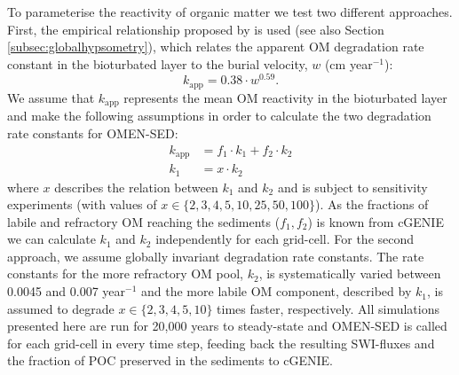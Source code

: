 \documentclass[gmd, manuscript]{copernicus}
\begin{document}
To parameterise the reactivity of organic matter we test two different approaches. First, the empirical relationship proposed by \citet{boudreau1997diagenetic} is used (see also Section \ref{subsec:globalhypsometry}), 
which relates the apparent OM degradation rate constant in the bioturbated layer to the burial velocity, $w$ (cm year$^{-1}$):
\begin{equation}
 k_\mathrm{app} = 0.38 \cdot w^{0.59}.
\end{equation}
We assume that $k_\mathrm{app}$ represents the mean OM reactivity in the bioturbated layer and make the following assumptions in order to calculate the two degradation rate constants for OMEN-SED:
\begin{align}
  k_\mathrm{app} &= f_1 \cdot k_1 + f_2 \cdot k_2 \label{boudreau_assumption1}\\
  k_1 &= x \cdot k_2					\label{boudreau_assumption2}
\end{align}
where $x$ describes the relation between $k_1$ and $k_2$ and is subject to sensitivity experiments (with values of $x \in \{2, 3, 4, 5, 10, 25, 50, 100\}$). 
As the fractions of labile and refractory OM reaching the sediments ($f_1, f_2$) is known from cGENIE we can calculate $k_1$ and $k_2$ independently for each grid-cell. 
For the second approach, we assume globally invariant degradation rate constants. The rate constants for the more refractory OM pool, $k_2$, is systematically varied between 0.0045 and 0.007 year$^{-1}$ and the more labile 
OM component, described by $k_1$, is assumed to degrade $x \in \{2, 3, 4, 5, 10\}$ times faster, respectively. 
All simulations presented here are run for 20,000 years to steady-state and OMEN-SED is called for each grid-cell in every time step, feeding back the resulting SWI-fluxes and the 
fraction of POC preserved in the sediments to cGENIE. 
\end{document}
